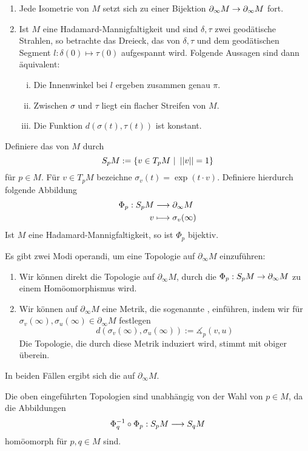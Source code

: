 \documentclass{book}
\begin{document}
\Bem{}
\begin{enumerate}[1.)]
\item Jede Isometrie von $M$ setzt sich zu einer Bijektion $\partial_\infty M \overset{}{\rightarrow} \partial_\infty M$ fort.
\item Ist $M$ eine Hadamard-Mannigfaltigkeit und sind $\delta, \tau$ zwei geodätische Strahlen, so betrachte das Dreieck, das von $\delta, \tau$ und dem geodätischen Segment $l : \delta(0) \mapsto \tau(0)$ aufgespannt wird. Folgende Aussagen sind dann äquivalent:
\begin{enumerate}[i.]
\item Die Innenwinkel bei $l$ ergeben zusammen genau $\pi$.
\item Zwischen $\sigma$ und $\tau$ liegt ein flacher Streifen von $M$.
\item Die Funktion $d(\sigma(t), \tau(t))$ ist konstant.
\end{enumerate}
\end{enumerate}

\Lem{}
Definiere das  von $M$ durch
\[ S_pM := \set{v \in T_pM}{\norm{v} = 1} \]
für $p \in M$. Für $v \in T_pM$ bezeichne $\sigma_v(t) = \exp(t\cdot v)$. Definiere hierdurch folgende Abbildung
\begin{align*}
\Phi_p : S_pM & \overset{}{\longrightarrow} \partial_\infty M\\
v & \longmapsto \sigma_v(\infty)
\end{align*}
Ist $M$ eine Hadamard-Mannigfaltigkeit, so ist $\Phi_p$ bijektiv.

\Bem{}
Es gibt zwei Modi operandi, um eine Topologie auf $\partial_\infty M$ einzuführen:
\begin{enumerate}[1.)]
\item Wir können direkt die Topologie auf $\partial_\infty M$, durch die $\Phi_p : S_pM  \overset{}{\rightarrow} \partial_\infty M$ zu einem Homöomorphismus wird.
\item Wir können auf $\partial_\infty M$ eine Metrik, die sogenannte , einführen, indem wir für $\sigma_v(\infty), \sigma_u(\infty) \in \partial_\infty M$ festlegen
\[ d(\sigma_v(\infty), \sigma_u(\infty)) := \measuredangle_p(v,u) \]
Die Topologie, die durch diese Metrik induziert wird, stimmt mit obiger überein.
\end{enumerate} 
In beiden Fällen ergibt sich die  auf $\partial_\infty M$.

\Lem{}
Die oben eingeführten Topologien sind unabhängig von der Wahl von $p \in M$, da die Abbildungen
\[ \Phi_q^{-1} \circ \Phi_p : S_pM\overset{}{\longrightarrow} S_qM \]
homöomorph für $p,q \in M$ sind.
\end{document}
